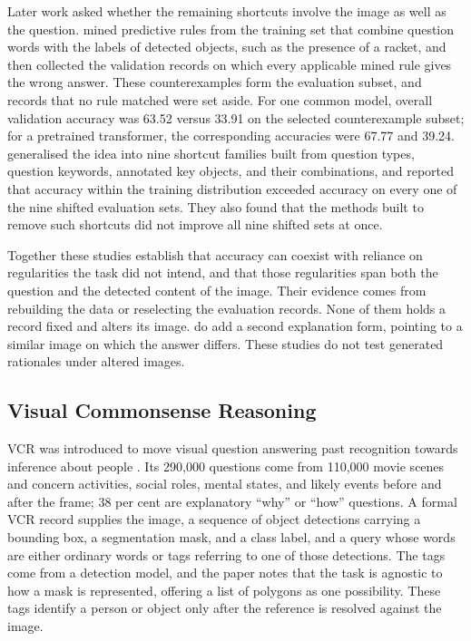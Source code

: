 Later work asked whether the remaining shortcuts involve the image as well as the
question. \citet{DBLP:conf/iccv/DancetteCTC21} mined predictive rules from the
training set that combine question words with the labels of detected objects, such
as the presence of a racket, and then collected the validation records on which
every applicable mined rule gives the wrong answer. These counterexamples form
the evaluation subset, and records that no rule matched were set aside. For one
common model, overall validation accuracy was 63.52 versus 33.91 on the selected
counterexample subset; for a pretrained transformer, the corresponding accuracies
were 67.77 and 39.24. \citet{DBLP:conf/emnlp/SiMZLL0CWZ22} generalised the idea into nine
shortcut families built from question types, question keywords, annotated key
objects, and their combinations, and reported that accuracy within the training
distribution exceeded accuracy on every one of the nine shifted evaluation sets.
They also found that the methods built to remove such shortcuts did not improve
all nine shifted sets at once.

Together these studies establish that accuracy can coexist with reliance on
regularities the task did not intend, and that those regularities span both the
question and the detected content of the image. Their evidence comes from
rebuilding the data or reselecting the evaluation records. None of them holds a
record fixed and alters its image. \citet{DBLP:conf/cvpr/GoyalKSBP17} do add a
second explanation form, pointing to a similar image on which the answer differs.
These studies do not test generated rationales under altered images.

\subsection{Visual Commonsense Reasoning}
\label{sec:background-vcr}

VCR was introduced to move visual question answering past recognition towards
inference about people
\citep{DBLP:conf/cvpr/ZellersBFC19}. Its 290,000 questions come from 110,000 movie
scenes and concern activities, social roles, mental states, and likely events
before and after the frame; 38 per cent are explanatory \enquote{why} or
\enquote{how} questions. A formal VCR record supplies the image, a sequence of
object detections carrying a bounding box, a segmentation mask, and a class label,
and a query whose words are either ordinary words or tags referring to one of
those detections. The tags come from a detection model, and the paper notes that
the task is agnostic to how a mask is represented, offering a list of polygons as
one possibility. These tags identify a person or object
only after the reference is resolved against the image.

